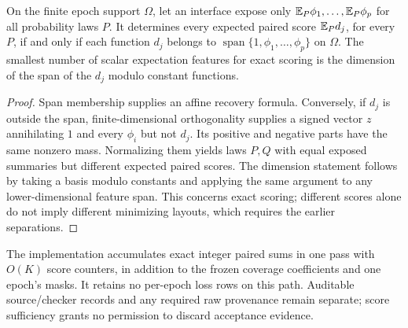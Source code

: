 \begin{proposition}\label{prop:summary-span}
On the finite epoch support $\Omega$, let an interface expose only
$\mathbb E_P\phi_1,\ldots,\mathbb E_P\phi_p$ for all probability laws $P$.
It determines every expected paired score $\mathbb E_Pd_j$, for every $P$, if and
only if each function $d_j$ belongs to
$\operatorname{span}\{1,\phi_1,\ldots,\phi_p\}$ on $\Omega$.
The smallest number of scalar expectation features for exact scoring is
the dimension of the span of the $d_j$ modulo constant functions.
\end{proposition}
\begin{proof}
Span membership supplies an affine recovery formula. Conversely, if
$d_j$ is outside the span, finite-dimensional orthogonality supplies a
signed vector $z$ annihilating $1$ and every $\phi_i$ but not $d_j$.
Its positive and negative parts have the same nonzero mass. Normalizing
them yields laws $P,Q$ with equal exposed summaries but different expected
paired scores. The dimension statement follows by taking a basis modulo
constants and applying the same argument to any lower-dimensional feature
span. This concerns exact scoring; different scores alone do not imply
different minimizing layouts, which requires the earlier separations.
\end{proof}

The implementation accumulates exact integer paired sums in one pass with
$O(K)$ score counters, in addition to the frozen coverage coefficients and
one epoch's masks. It retains no per-epoch loss rows on this path. Auditable
source/checker records and any required raw provenance remain separate;
score sufficiency grants no permission to discard acceptance evidence.

